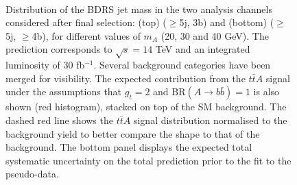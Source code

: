 \documentclass[preprintnumbers,superscriptaddress,nofootinbib,aps,prd,floatfix]{revtex4}
\newcommand{\ttbar}{\ensuremath{t\bar{t}}}
\newcommand{\BR} {\ensuremath{\mathrm{BR}}}
\begin{document}
\begin{figure}[htbp]
\begin{center}
 \\
\caption{\small {Distribution of the BDRS jet mass in the two analysis channels considered after final selection: 
(top) ($\geq$5j, 3b) and (bottom) ($\geq$5j, $\geq$4b), for different values of $m_A$ (20, 30 and 40 GeV).
The prediction corresponds to $\sqrt{s}=14$ TeV and an integrated luminosity of 30 fb$^{-1}$.
Several background categories have been merged for visibility. The expected contribution from 
the $\ttbar A$ signal under the assumptions that $g_t=2$ and $\BR(A\to b\bar{b})=1$  is also shown
(red histogram), stacked on top of the SM background. The dashed red line shows the $\ttbar A$  signal 
distribution normalised to the background yield to better compare the shape to that of the background.
The bottom panel displays the expected total systematic uncertainty on the total prediction prior to the fit 
to the pseudo-data.}}
\label{fig:mA_1} 
\end{center}
\end{figure}
\end{document}
